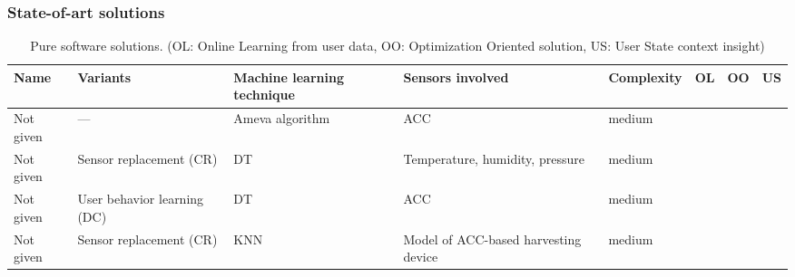 \documentclass[compress,9pt,xcolor={dvipsnames,table}]{beamer}
\begin{document}
\begin{frame}[t]\frametitle{State-of-art solutions}
\begin{table}
    \centering
    \scriptsize{}
    \resizebox{\textwidth}{!} { 
    \begin{tabular}{C{0.11\textwidth}C{0.2\textwidth}C{0.17\textwidth}C{0.15\textwidth}C{0.09\textwidth}C{0.05\textwidth}C{0.05\textwidth}C{0.05\textwidth}}
    \toprule
    \textbf{Name} & \textbf{Variants} & \textbf{Machine learning technique} & \textbf{Sensors involved} & \textbf{Complexity} & \textbf{OL} & \textbf{OO} & \textbf{US} \\
    \midrule

    Not given           \cite{AlvarezDeLaConcepcion2014,Morillo2015} & --- & Ameva algorithm & ACC & medium \\
    
    \cmidrule(l){1-8}
    Not given           \cite{Mazilu2013} & Sensor replacement (CR) & DT & Temperature, humidity, pressure & medium \\

    \cmidrule(l){1-8}
    Not given           \cite{Srinivasan2012} & User behavior learning (DC) & DT & ACC & medium \\
    
    \cmidrule(l){1-8}
    Not given           \cite{Khalifa2015} & Sensor replacement (CR) & KNN & Model of ACC-based harvesting device & medium \\
    \bottomrule
    \end{tabular}
    }
    \protect\caption{Pure software solutions. (OL: Online Learning from user data, OO: Optimization Oriented solution, US: User State context insight)\label{tab:works-software-approach-2}}
\end{table}
\end{frame}
\end{document}
